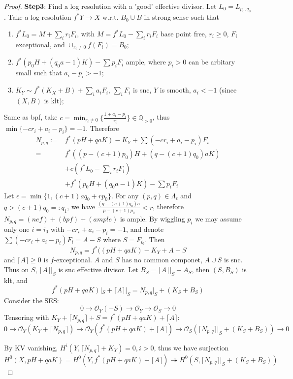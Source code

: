 \documentclass{article}
\begin{document}
\begin{proof}
	\textbf{Step3}: Find a  log resolution with a 'good' effective divisor. Let $ L_0=L_{p_0,q_0} $. Take a log  resolution $ f^*Y\to X $ w.r.t. $ B_0\cup B $ in strong sense such that 
	\begin{enumerate}
		\item $ f^*L_0=M+\sum_ir_iF_i $, with $ M=f^*L_0-\sum_ir_iF_i $ base point free, $ r_i\geqslant 0 $, $ F_i $ exceptional, and $ \cup_{r_i\neq 0}f(F_i)=B_0 $;
		\item $ f^*(p_0H+(q_0a-1)K)-\sum p_iF_i $ ample, where $ p_i>0 $ can be arbitary small such that $ a_i-p_i>-1 $;
		\item $ K_Y\sim f^*(K_X+B)+\sum_ia_iF_i $, $ \sum_iF_i $ is snc, $ Y $ is smooth,  $ a_i<-1 $ (since $ (X,B) $ is klt);
	\end{enumerate}
Same as bpf, take $ c=\min_{r_i\neq 0} \{ \frac{1+a_i-p_i}{r_i} \}\in \mathbb{Q}_{>0} $, thus $ \min \{ -cr_i+a_i-p_i \}=-1 $. Therefore
\begin{equation*}
	\begin{aligned}
	N_{p,q}:=&f^*(pH+qaK)-K_Y+\sum(-cr_i+a_i-p_i)F_i\\
	=&f^*((p-(c+1)p_0)H+(q-(c+1)q_0)aK)\\
	&+c(f^*L_0-\sum_ir_iF_i )\\
	&+f^*(p_0H+(q_0a-1)K)-\sum p_iF_i  
	\end{aligned}
\end{equation*}
Let $ \epsilon=\min\{1,(c+1)aq_0+rp_0\} $. For any $ (p,q)\in \Lambda_{\epsilon} $ and $ q>(c+1)q_0=:q_1 $, we have $ \frac{(q-(c+1)q_0)a}{p-(c+1)p_0}<r $, therefore $ N_{p,q}=(nef)+(bpf)+(ample) $ is ample. By wiggling $ p_i $  we may assume only one $ i=i_0 $ with $ -cr_i+a_i-p_i=-1 $, and denote $ \sum(-cr_i+a_i-p_i)F_i=A-S $ where $ S=F_{i_0} $. Then 
$$ N_{p,q}=f^*((pH+qaK)-K_Y+A-S $$ 
and $ \lceil A\rceil\geqslant 0 $ is $ f $-exceptional. $ A $ and $S  $ has no common componet, $ A\cup S $ is snc. Thus on $ S $, $ \lceil A\rceil|_S $ is snc effective divisor. Let $ B_S=\lceil A\rceil|_S-A_S $, then $ (S,B_S) $ is klt, and
$$ f^*(pH+qaK)|_S+\lceil A\rceil|_S=N_{p,q}|_S+(K_S+B_S) $$ 
Consider the  SES:
$$ 0\to \mathcal{O}_Y(-S)\to \mathcal{O}_Y\to \mathcal{O}_S\to 0    $$
Tensoring with $ K_Y+\lceil N_{p,q}\rceil +S=f^*(pH+qaK)+\lceil A\rceil $:
$$ 0\to \mathcal{O}_Y(K_Y+\lceil N_{p,q}\rceil)\to \mathcal{O}_Y(f^*(pH+qaK)+\lceil A\rceil)\to \mathcal{O}_S(\lceil N_{p,q}\rceil|_S+(K_S+B_S))\to 0    $$

By KV vanishing, $ H^i(Y,\lceil N_{p,q}\rceil +K_Y)=0, i>0 $, thus we have surjection
$$ H^0(X,pH+qaK)=H^0(Y,f^*(pH+qaK)+\lceil A\rceil)\twoheadrightarrow H^0(S,\lceil N_{p,q}\rceil|_S+(K_S+B_S)) $$




\end{proof}
\end{document}
